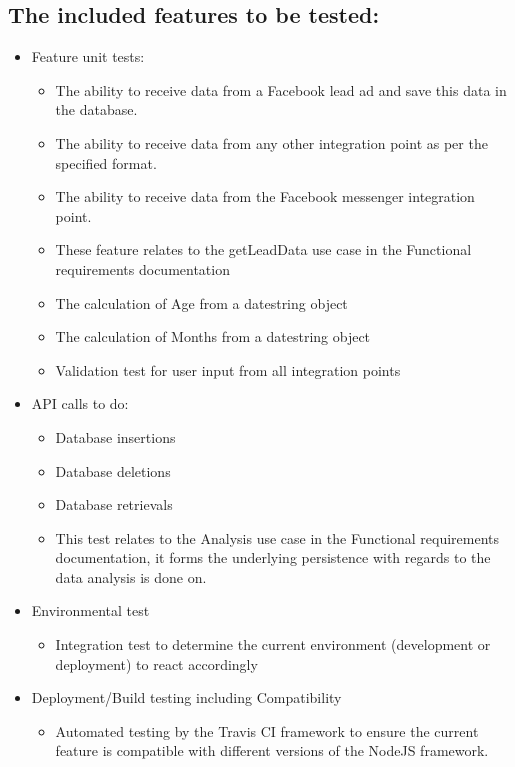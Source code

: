 \documentclass{article}
\begin{document}
\subsection{The included features to be tested:}
\begin{itemize}
\item Feature unit tests:
	\begin{itemize}
	\item The ability to receive data from a Facebook lead ad and save this data in the database.
	\item The ability to receive data from any other integration point as per the specified format.
	\item The ability to receive data from the Facebook messenger integration point.
	\item These feature relates to the getLeadData use case in the Functional requirements documentation
	\item The calculation of Age from a datestring object
	\item The calculation of Months from a datestring object
	\item Validation test for user input from all integration points
	\end{itemize}
	
\item API calls to do:
	\begin{itemize}
	\item Database insertions 
	\item Database deletions 
	\item Database retrievals 
	\item This test relates to the Analysis use case in the Functional requirements documentation, it forms the underlying persistence with regards to the data analysis is done on.
	\end{itemize}
\item Environmental test
	\begin{itemize}
	\item Integration test to determine the current environment (development or deployment) to react accordingly 
	\end{itemize}
\item Deployment/Build testing including Compatibility
		\begin{itemize}
	\item Automated testing by the Travis CI framework to ensure the current feature is compatible with different versions of the NodeJS framework. 
	\end{itemize}
\end{itemize}
\end{document}
